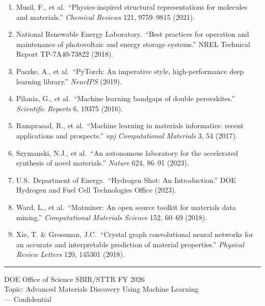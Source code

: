 \documentclass[11pt,letterpaper]{article}
\begin{document}
\begin{enumerate}[noitemsep]
\item Musil, F., et al.\ ``Physics-inspired structural representations for molecules and materials.'' \textit{Chemical Reviews} 121, 9759--9815 (2021).

\item National Renewable Energy Laboratory.\ ``Best practices for operation and maintenance of photovoltaic and energy storage systems.'' NREL Technical Report TP-7A40-73822 (2018).

\item Paszke, A., et al.\ ``PyTorch: An imperative style, high-performance deep learning library.'' \textit{NeurIPS} (2019).

\item Pilania, G., et al.\ ``Machine learning bandgaps of double perovskites.'' \textit{Scientific Reports} 6, 19375 (2016).

\item Ramprasad, R., et al.\ ``Machine learning in materials informatics: recent applications and prospects.'' \textit{npj Computational Materials} 3, 54 (2017).

\item Szymanski, N.J., et al.\ ``An autonomous laboratory for the accelerated synthesis of novel materials.'' \textit{Nature} 624, 86--91 (2023).

\item U.S.\ Department of Energy.\ ``Hydrogen Shot: An Introduction.'' DOE Hydrogen and Fuel Cell Technologies Office (2023).

\item Ward, L., et al.\ ``Matminer: An open source toolkit for materials data mining.'' \textit{Computational Materials Science} 152, 60--69 (2018).

\item Xie, T. \& Grossman, J.C.\ ``Crystal graph convolutional neural networks for an accurate and interpretable prediction of material properties.'' \textit{Physical Review Letters} 120, 145301 (2018).

\end{enumerate}

\vspace{1cm}
\noindent\textcolor{doegreen}{\rule{\textwidth}{1.5pt}}

\begin{center}
\small\textcolor{doegray}{
DOE Office of Science SBIR/STTR FY 2026\\
Topic: Advanced Materials Discovery Using Machine Learning\\
[Company Name] --- Confidential
}
\end{center}
\end{document}
